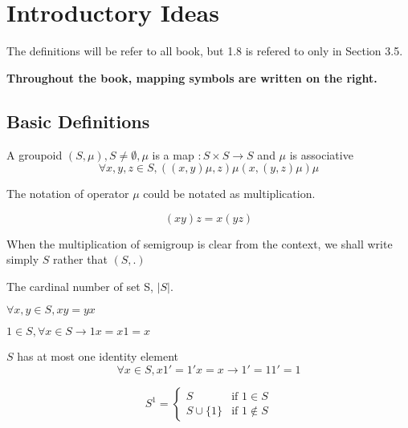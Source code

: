 \section[1]{Introductory Ideas}
The definitions will be refer to all book, but 1.8 is refered to only in Section 3.5.

\textbf{Throughout the book, mapping symbols are written on the right.}

\subsection[1]{Basic Definitions}

\begin{Def}[Semigroup]
    A groupoid $(S,\mu), S \neq \emptyset, \mu$ is a map $: S\times S \to S$ and $\mu$ is associative
    \begin{equation}
        \forall x,y,z \in S, ((x,y)\mu,z)\mu (x,(y,z)\mu)\mu
    \end{equation}
\end{Def}

The notation of operator $\mu$ could be notated as multiplication.

$$(x y)z=x(y z)$$

When the multiplication of semigroup is clear from the context, we shall write simply $S$ rather that $(S,.)$

\begin{Def}
    The cardinal number of set S, $|S|$.
\end{Def}

\begin{Def}
    $\forall x,y \in S, x y = y x$
\end{Def}

\begin{Def}[Identity]
    $1\in S, \forall x \in S \to 1x=x1=x $
\end{Def}

$S$ has at most one identity element
$$\forall x \in S, x1'=1'x=x \to 1'=11' =1$$


\begin{Sym}[$S^{1}$]
    \[
        S^1 =
        \begin{cases}
            S               &   \text{if } 1 \in S  \\
            S \cup \{1\}    &   \text{if } 1 \notin S
        \end{cases}
    \]
\end{Sym}


